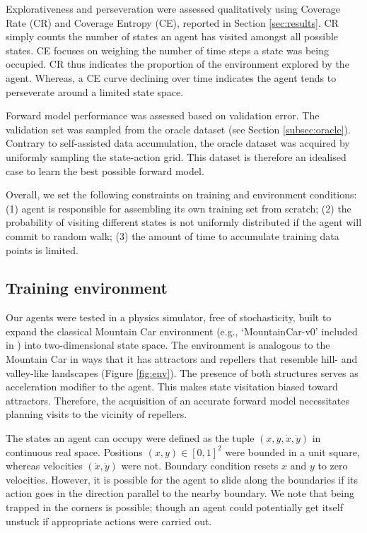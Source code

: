 \documentclass[utf8]{frontiersSCNS}
\begin{document}
Explorativeness and perseveration were assessed qualitatively using Coverage Rate (CR) and Coverage Entropy (CE), reported in Section \ref{sec:results}. CR simply counts the number of states an agent has visited amongst all possible states. CE focuses on weighing the number of time steps a state was being occupied. CR thus indicates the proportion of the environment explored by the agent. Whereas, a CE curve declining over time indicates the agent tends to perseverate around a limited state space.

Forward model performance was assessed based on validation error. The validation set was sampled from the oracle dataset (see Section \ref{subsec:oracle}). Contrary to self-assisted data accumulation, the oracle dataset was acquired by uniformly sampling the state-action grid. This dataset is therefore an idealised case to learn the best possible forward model. 

Overall, we set the following constraints on training and environment conditions: (1) agent is responsible for assembling its own training set from scratch; (2) the probability of visiting different states is not uniformly distributed if the agent will commit to random walk; (3) the amount of time to accumulate training data points is limited. 

\subsection{Training environment}

Our agents were tested in a physics simulator, free of stochasticity, built to expand the classical Mountain Car environment (e.g., `MountainCar-v0' included in \citet{aigym}) into two-dimensional state space. The environment is analogous to the Mountain Car in ways that it has attractors and repellers that resemble hill- and valley-like landscapes (Figure \ref{fig:env}). The presence of both structures serves as acceleration modifier to the agent. This makes state visitation biased toward attractors. Therefore, the acquisition of an accurate forward model necessitates planning visits to the vicinity of repellers.

The states an agent can occupy were defined as the tuple $(x, y, \dot x, \dot y)$ in continuous real space. Positions $(x, y) \in [0, 1]^2$ were bounded in a unit square, whereas velocities $(\dot x, \dot y)$ were not. Boundary condition resets $x$ and $y$ to zero velocities. However, it is possible for the agent to slide along the boundaries if its action goes in the direction parallel to the nearby boundary. We note that being trapped in the corners is possible; though an agent could potentially get itself unstuck if appropriate actions were carried out. 
\end{document}
